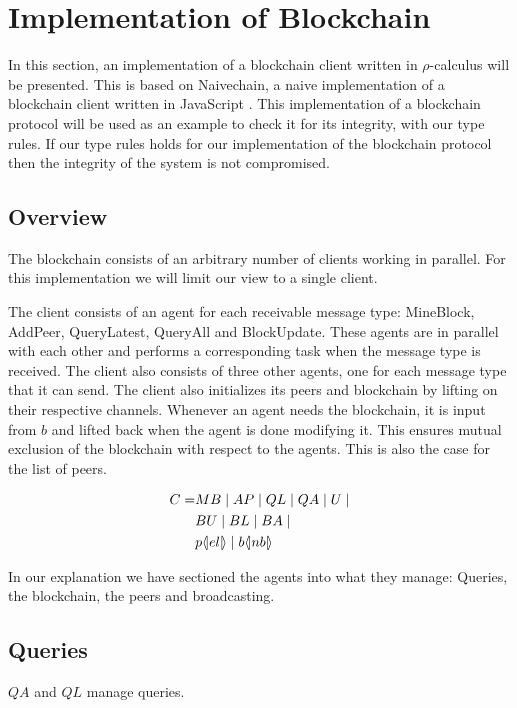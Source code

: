 \section{Implementation of Blockchain}\label{sec:blockchain}
In this section, an implementation of a blockchain client written in $\rho$-calculus will be presented.
This is based on Naivechain, a naive implementation of a blockchain client written in JavaScript \cite{naivechain}.
This implementation of a blockchain protocol will be used as an example to check it for its integrity, with our type rules.
If our type rules holds for our implementation of the blockchain protocol then the integrity of the system is not compromised.

\subsection{Overview}

The blockchain consists of an arbitrary number of clients working in parallel. For this implementation we will limit our view to a single client.

The client consists of an agent for each receivable message type: MineBlock, AddPeer, QueryLatest, QueryAll and BlockUpdate.
These agents are in parallel with each other and performs a corresponding task when the message type is received.
The client also consists of three other agents, one for each message type that it can send.
The client also initializes its peers and blockchain by lifting on their respective channels.
Whenever an agent needs the blockchain, it is input from $b$ and lifted back when the agent is done modifying it.
This ensures mutual exclusion of the blockchain with respect to the agents.
This is also the case for the list of peers.

\begin{align*}
    C =& MB \mid AP \mid QL \mid QA \mid U \mid\\
    & BU \mid BL \mid BA \mid \\
    & p \langle \! | el | \! \rangle \mid b \langle \! | nb | \! \rangle
\end{align*}

In our explanation we have sectioned the agents into what they manage: Queries, the blockchain, the peers and broadcasting.

\subsection{Queries}

$QA$ and $QL$ manage queries.

